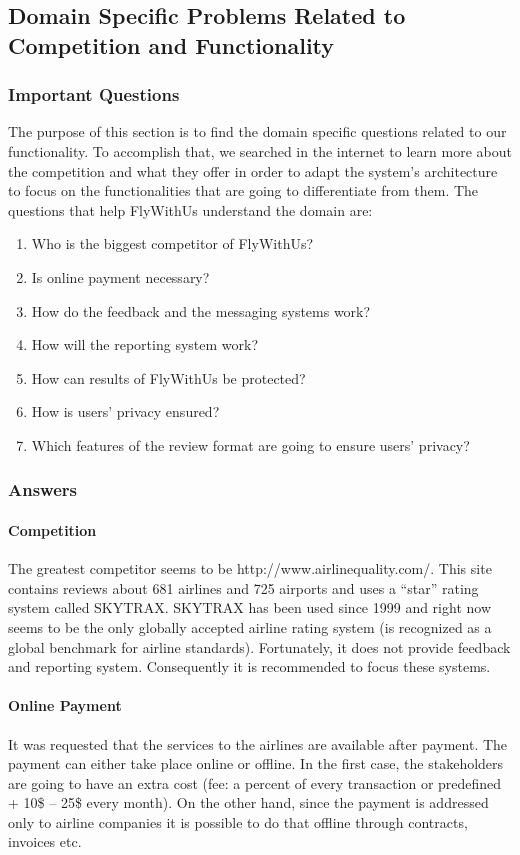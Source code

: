 \subsection{Domain Specific Problems Related to Competition and Functionality}
\subsubsection{Important Questions}
The purpose of this section is to find the domain specific questions related to our functionality. To accomplish that, we searched in the internet to learn more about the competition
and what they offer in order to adapt the system's architecture to focus on the functionalities that are going to differentiate from them. The questions that help FlyWithUs understand the 
domain are:
\begin{enumerate}
\item Who is the biggest competitor of FlyWithUs?
\item Is online payment necessary?
\item How do the feedback and the messaging systems work?
\item How will the reporting system work?
\item How can results of FlyWithUs be protected?
\item How is users' privacy ensured?
\item Which features of the review format are going to ensure users' privacy?
\end{enumerate}

\subsubsection{Answers}
\paragraph{Competition} The greatest competitor seems to be http://www.airlinequality.com/. This site contains reviews about 681 airlines and 725 airports and uses a “star” rating 
system called SKYTRAX. SKYTRAX has been used since 1999 and right now seems to be the only globally accepted airline rating system (is recognized as a global benchmark for airline 
standards). Fortunately, it does not provide feedback and reporting system. Consequently it is recommended to focus these systems.

\paragraph{Online Payment} It was requested that the services to the airlines are available after payment. The payment can either take place online or offline. In the first case, 
the stakeholders are going to have an extra cost (fee: a percent of every transaction or predefined + 10\$ – 25\$ every month). On the other hand, since the 
payment is addressed only to airline companies it is possible to do that offline through contracts, invoices etc.


